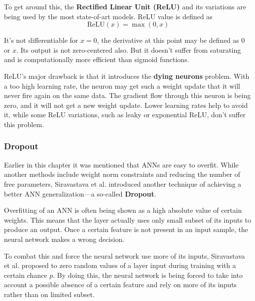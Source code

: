 \documentclass[thesis=B,english]{FITthesis}[2019/12/23]
\begin{document}
	To get around this, the \textbf{Rectified Linear Unit (ReLU)}\cite{sparse_rectifier} and its variations are being used by the most state-of-art models. ReLU value is defined as
	\[\text{ReLU}(x) = \max(0, x)\]
	
	It's not differentiable for $x = 0$, the derivative at this point may be defined as 0 or $x$. Its output is not zero-centered also. But it doesn't suffer from saturating and is computationally more efficient than sigmoid functions.
	
	ReLU's major drawback is that it introduces the \textbf{dying neurons} problem. With a too high learning rate, the neuron may get such a weight update that it will never fire again on the same data. The gradient flow through this neuron is being zero, and it will not get a new weight update. Lower learning rates help to avoid it, while some ReLU variations\cite{wiki_relu}, such as leaky or exponential ReLU, don't suffer this problem.
	
	\subsubsection{Dropout}
	
	Earlier in this chapter it was mentioned that ANNs are easy to overfit. While another methods include weight norm constraints and reducing the number of free parameters\cite{lecun_generalization}, Siravastava et al.\cite{dropout} introduced another technique of achieving a better ANN generalization---a so-called \textbf{Dropout}.
	
	Overfitting of an ANN is often being shown as a high absolute value of certain weights. This means that the layer actually uses only small subset of its inputs to produce an output. Once a certain feature is not present in an input sample, the neural network makes a wrong decision.
	
	To combat this and force the neural network use more of its inputs, Siravastava et al. proposed to zero random values of a layer input during training with a certain chance $p$. By doing this, the neural network is being forced to take into account a possible absence of a certain feature and rely on more of its inputs rather than on limited subset.
	
\end{document}
